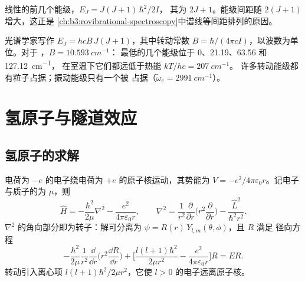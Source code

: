 \begin{omfigure}

{\small 线性的前几个能级，$E_J = J(J+1)\,\hbar^2/2I$，
其为 $2J + 1$。能级间距随 $2(J+1)$ 增大，这正是
\cref{ch:b3:rovibrational-spectroscopy}中谱线等间距排列的原因。}
\end{omfigure}

\begin{example}\label{ex:b3:quantum-model-systems:hcl}
光谱学家写作 $E_J = hcB\,J(J+1)$，其中转动常数 $B =
\hbar/(4\pi cI)$，以波数为单位。对于 ，$B = \qty{10.593}{cm^{-1}}$：
最低的几个能级位于 0、21.19、63.56 和 \qty{127.12}{cm^{-1}}，
在室温下它们都远低于热能 $kT/hc = \qty{207}{cm^{-1}}$。
许多转动能级都有粒子占据；振动能级只有一个被
占据（$\tilde\omega_e = \qty{2991}{cm^{-1}}$）。
\end{example}

\section{氢原子与隧道效应}

\subsection*{氢原子的求解}

电荷为 $-e$ 的电子绕电荷为 $+e$ 的原子核运动，其势能为 $V = -e^2/
4\pi\varepsilon_0r$。记电子与质子的为 $\mu$，则
\[
\hat H = -\frac{\hbar^2}{2\mu}\nabla^2 - \frac{e^2}{4\pi\varepsilon_0r},\qquad
\nabla^2 = \frac{1}{r^2}\frac{\partial}{\partial r}\Big(r^2\frac{\partial}{
\partial r}\Big) - \frac{\hat L^2}{\hbar^2r^2}.
\]
$\nabla^2$ 的角向部分即为转子：解可分离为
$\psi = R(r)\,Y_{l,m}(\theta,\phi)$，且 $R$ 满足
径向方程
\[
-\frac{\hbar^2}{2\mu}\frac{1}{r^2}\frac{\dd}{\dd r}\Big(r^2\frac{\dd R}{\dd r}
\Big) + \Big[\frac{l(l+1)\hbar^2}{2\mu r^2} - \frac{e^2}{4\pi\varepsilon_0r}
\Big]R = ER.
\]
转动引入离心项 $l(l+1)\hbar^2/2\mu r^2$，它使
$l > 0$ 的电子远离原子核。

